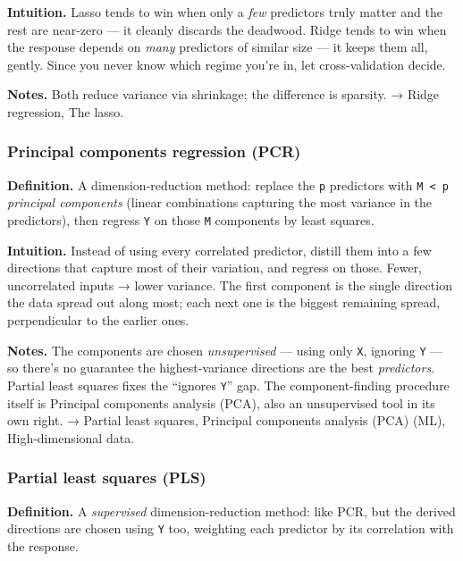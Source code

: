 \documentclass[
  10pt,
  letterpaper,
  onecolumn]{article}
\begin{document}
\textbf{Intuition.} Lasso tends to win when only a \emph{few} predictors
truly matter and the rest are near-zero --- it cleanly discards the
deadwood. Ridge tends to win when the response depends on \emph{many}
predictors of similar size --- it keeps them all, gently. Since you
never know which regime you're in, let cross-validation decide.

\textbf{Notes.} Both reduce variance via shrinkage; the difference is
sparsity. → Ridge regression, The lasso.

\hypertarget{principal-components-regression-pcr}{%
\subsubsection{Principal components regression
(PCR)}\label{principal-components-regression-pcr}}

\textbf{Definition.} A dimension-reduction method: replace the
\texttt{p} predictors with \texttt{M\ \textless{}\ p} \emph{principal
components} (linear combinations capturing the most variance in the
predictors), then regress \texttt{Y} on those \texttt{M} components by
least squares.

\textbf{Intuition.} Instead of using every correlated predictor, distill
them into a few directions that capture most of their variation, and
regress on those. Fewer, uncorrelated inputs → lower variance. The first
component is the single direction the data spread out along most; each
next one is the biggest remaining spread, perpendicular to the earlier
ones.

\textbf{Notes.} The components are chosen \emph{unsupervised} --- using
only \texttt{X}, ignoring \texttt{Y} --- so there's no guarantee the
highest-variance directions are the best \emph{predictors}. Partial
least squares fixes the ``ignores \texttt{Y}'' gap. The
component-finding procedure itself is Principal components analysis
(PCA), also an unsupervised tool in its own right. → Partial least
squares, Principal components analysis (PCA) (ML), High-dimensional
data.

\hypertarget{partial-least-squares-pls}{%
\subsubsection{Partial least squares
(PLS)}\label{partial-least-squares-pls}}

\textbf{Definition.} A \emph{supervised} dimension-reduction method:
like PCR, but the derived directions are chosen using \texttt{Y} too,
weighting each predictor by its correlation with the response.
\end{document}
